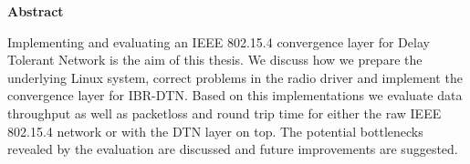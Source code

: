 \documentclass[11pt,twoside]{scrbook}
\begin{document}
\centerline{\bf Abstract}

Implementing and evaluating an IEEE 802.15.4 convergence layer for Delay
Tolerant Network is the aim of this thesis. We discuss how we prepare the
underlying Linux system, correct problems in the radio driver and
implement the convergence layer for IBR-DTN. Based on this implementations we
evaluate data throughput as well as packetloss and round trip time for either
the raw IEEE 802.15.4 network or with the DTN layer on top. The potential
bottlenecks revealed by the evaluation are discussed and future improvements
are suggested.

\cleardoublepage



\cleardoublepage
\tableofcontents
\cleardoublepage
\listoffigures
\listoftables


\setcounter{page}{0}

\pagestyle{headings}


















\begin{appendix}




\end{appendix}
\end{document}
